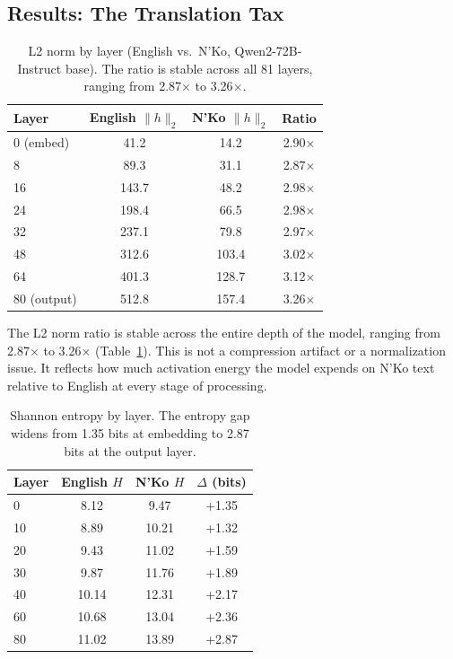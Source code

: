 \documentclass[11pt]{article}
\begin{document}
\subsection{Results: The Translation Tax}

\begin{table}[t]
\centering
\small
\begin{tabular}{lccc}
\toprule
\textbf{Layer} & \textbf{English $\|h\|_2$} & \textbf{N'Ko $\|h\|_2$} & \textbf{Ratio} \\
\midrule
0 (embed) & 41.2 & 14.2 & 2.90$\times$ \\
8 & 89.3 & 31.1 & 2.87$\times$ \\
16 & 143.7 & 48.2 & 2.98$\times$ \\
24 & 198.4 & 66.5 & 2.98$\times$ \\
32 & 237.1 & 79.8 & 2.97$\times$ \\
48 & 312.6 & 103.4 & 3.02$\times$ \\
64 & 401.3 & 128.7 & 3.12$\times$ \\
80 (output) & 512.8 & 157.4 & 3.26$\times$ \\
\bottomrule
\end{tabular}
\caption{L2 norm by layer (English vs.\ N'Ko, Qwen2-72B-Instruct base). The ratio is stable across all 81 layers, ranging from 2.87$\times$ to 3.26$\times$.}
\label{tab:l2-norm}
\end{table}

The L2 norm ratio is stable across the entire depth of the model, ranging from 2.87$\times$ to 3.26$\times$ (Table~\ref{tab:l2-norm}).
This is not a compression artifact or a normalization issue.
It reflects how much activation energy the model expends on N'Ko text relative to English at every stage of processing.

\begin{table}[t]
\centering
\small
\begin{tabular}{lccc}
\toprule
\textbf{Layer} & \textbf{English $H$} & \textbf{N'Ko $H$} & \textbf{$\Delta$ (bits)} \\
\midrule
0 & 8.12 & 9.47 & +1.35 \\
10 & 8.89 & 10.21 & +1.32 \\
20 & 9.43 & 11.02 & +1.59 \\
30 & 9.87 & 11.76 & +1.89 \\
40 & 10.14 & 12.31 & +2.17 \\
60 & 10.68 & 13.04 & +2.36 \\
80 & 11.02 & 13.89 & +2.87 \\
\bottomrule
\end{tabular}
\caption{Shannon entropy by layer. The entropy gap widens from 1.35 bits at embedding to 2.87 bits at the output layer.}
\label{tab:entropy}
\end{table}
\end{document}
